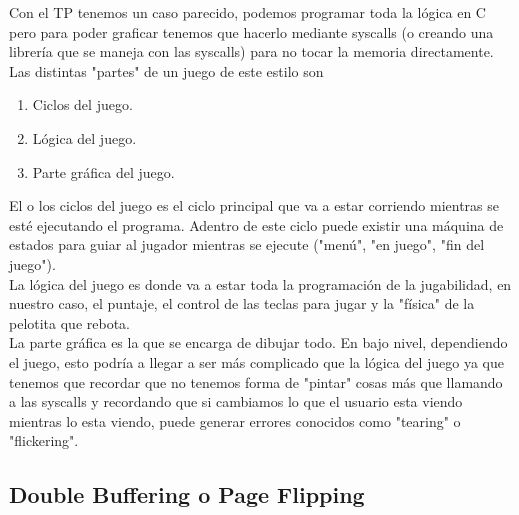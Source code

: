 \documentclass[]{article}
\begin{document}
Con el TP tenemos un caso parecido, podemos programar toda la l\'ogica en C pero para poder graficar tenemos que hacerlo mediante syscalls (o creando una librer\'ia que se maneja con las syscalls) para no tocar la memoria directamente.\\

Las distintas "partes" de un juego de este estilo son
\begin{enumerate}
	\item Ciclos del juego.
	\item L\'ogica del juego.
	\item Parte gr\'afica del juego.
\end{enumerate}

El o los ciclos del juego es el ciclo principal que va a estar corriendo mientras se est\'e ejecutando el programa. Adentro de este ciclo puede existir una m\'aquina de estados para guiar al jugador mientras se ejecute ("men\'u", "en juego", "fin del juego").\\

La l\'ogica del juego es donde va a estar toda la programaci\'on de la jugabilidad, en nuestro caso, el puntaje, el control de las teclas para jugar y la "f\'isica" de la pelotita que rebota.\\

La parte gr\'afica es la que se encarga de dibujar todo. En bajo nivel, dependiendo el juego, esto podr\'ia a llegar a ser m\'as complicado que la l\'ogica del juego ya que tenemos que recordar que no tenemos forma de "pintar" cosas m\'as que llamando a las syscalls y recordando que si cambiamos lo que el usuario esta viendo mientras lo esta viendo, puede generar errores conocidos como "tearing" o "flickering".

\subsection*{Double Buffering o Page Flipping}
\end{document}
